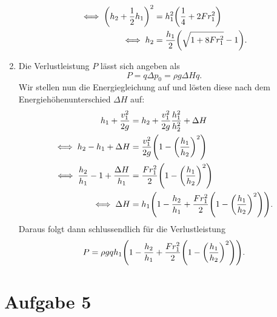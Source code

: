 \documentclass{exercise}
\begin{document}
\begin{enumerate}
\begin{align*}
            \iff \parentheses*{h_2 + \frac{1}{2}h_1}^2 &= h_1^2\parentheses*{\frac{1}{4} + 2Fr_1^2}\\
            \iff h_2 &= \frac{h_1}{2}\parentheses*{\sqrt{1 + 8Fr_1^2} - 1}.
        \end{align*}
        \item Die Verlustleistung \(P\) lässt sich angeben als
        \[
            P = q\Delta p_0 = \rho g\Delta Hq.
        \]
        Wir stellen nun die Energiegleichung auf und lösten diese nach dem Energiehöhenunterschied \(\Delta H\) auf:
        \begin{align*}
            h_1 + \frac{v_1^2}{2g} &= h_2 + \frac{v_1^2}{2g}\frac{h_1^2}{h_2^2} + \Delta H\\
            \iff h_2 - h_1 + \Delta H &= \frac{v_1^2}{2g}\parentheses*{1 - \parentheses*{\frac{h_1}{h_2}}^2}\\
            \iff \frac{h_2}{h_1} - 1 + \frac{\Delta H}{h_1} &= \frac{Fr_1^2}{2}\parentheses*{1 - \parentheses*{\frac{h_1}{h_2}}^2}\\
            \iff \Delta H &= h_1\parentheses*{1 - \frac{h_2}{h_1} + \frac{Fr_1^2}{2}\parentheses*{1 - \parentheses*{\frac{h_1}{h_2}}^2}}.
        \end{align*}
        Daraus folgt dann schlussendlich für die Verlustleistung
        \[
            P = \rho gqh_1\parentheses*{1 - \frac{h_2}{h_1} + \frac{Fr_1^2}{2}\parentheses*{1 - \parentheses*{\frac{h_1}{h_2}}^2}}.
        \]
    \end{enumerate}


    \section*{Aufgabe 5}
    
\end{document}
